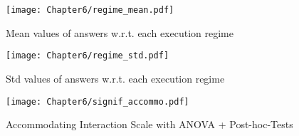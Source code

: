\begin{figure}[h]
    \texttt{[image: Chapter6/regime\_mean.pdf]}
    \caption{Mean values of answers w.r.t. each execution regime}
    \label{fig:regime_mean}
\end{figure}

\begin{figure}[h]
    \texttt{[image: Chapter6/regime\_std.pdf]}
    \caption{Std values of answers w.r.t. each execution regime}
    \label{fig:regime_std}
\end{figure}

\begin{figure}[h]
    \centering
    \texttt{[image: Chapter6/signif\_accommo.pdf]}
    \caption{Accommodating Interaction Scale with ANOVA + Post-hoc-Tests}
    \label{fig:accommodating_scale_anova}
\end{figure}

